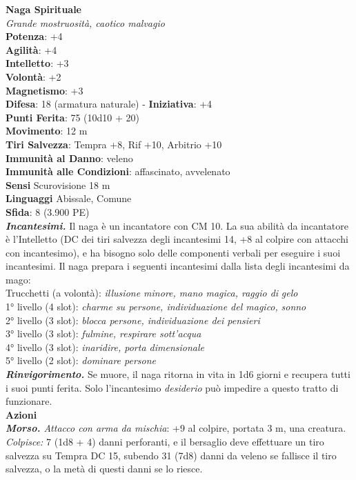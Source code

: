 \begin{multicols}{2}
\medskip\textbf{Naga Spirituale}\\
\emph{Grande mostruosità, caotico malvagio}\\
\textbf{Potenza}: +4\\
\textbf{Agilità}: +4\\
\textbf{Intelletto}: +3\\
\textbf{Volontà}: +2\\
\textbf{Magnetismo}: +3\\
\textbf{Difesa}: 18 (armatura naturale) - \textbf{Iniziativa}: +4\\
\textbf{Punti Ferita}: 75 (10d10 + 20)\\
\textbf{Movimento}: 12 m\\
\textbf{Tiri Salvezza}: Tempra +8, Rif +10, Arbitrio +10\\
\textbf{Immunità al Danno}: veleno\\
\textbf{Immunità alle Condizioni}: affascinato, avvelenato\\
\textbf{Sensi} Scurovisione 18 m\\
\textbf{Linguaggi} Abissale, Comune\\
\textbf{Sfida}: 8 (3.900 PE)\smallskip\\
\emph{\textbf{Incantesimi.}} Il naga è un incantatore con CM 10. La sua abilità da incantatore è l'Intelletto (DC dei tiri salvezza degli incantesimi 14, +8 al colpire con attacchi con incantesimo), e ha bisogno solo delle componenti verbali per eseguire i suoi incantesimi. Il naga prepara i seguenti incantesimi dalla lista degli incantesimi da mago: \\
Trucchetti (a volontà): \emph{illusione minore, mano magica, raggio di} \emph{gelo}\\
1° livello (4 slot): \emph{charme su persone, individuazione del magico,} \emph{sonno}\\
2° livello (3 slot): \emph{blocca persone, individuazione dei pensieri}\\
3° livello (3 slot): \emph{fulmine, respirare sott'acqua}\\
4° livello (3 slot): \emph{inaridire, porta dimensionale}\\
5° livello (2 slot): \emph{dominare persone}\\
\emph{\textbf{Rinvigorimento.}} Se muore, il naga ritorna in vita in 1d6 giorni e recupera tutti i suoi punti ferita. Solo l'incantesimo \emph{desiderio} può impedire a questo tratto di funzionare.\\
\smallskip\textbf{Azioni}\\
\emph{\textbf{Morso.} Attacco con arma da mischia}: +9 al colpire, portata 3 m, una creatura.\\
\emph{Colpisce:} 7 (1d8 + 4) danni perforanti, e il bersaglio deve effettuare un tiro salvezza su Tempra DC  15, subendo 31 (7d8) danni da veleno se fallisce il tiro salvezza, o la metà di questi danni se lo riesce.\\


\end{multicols}
